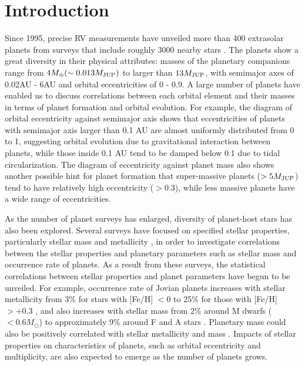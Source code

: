 \documentclass[manuscript]{aastex}
\newcommand{\mjup}{M_{\rm JUP}}
\begin{document}
\section{Introduction}

Since 1995, precise RV measurements have unveiled more than 400 extrasolar planets from surveys that include roughly 3000 nearby stars \citep[e.g.,][]{2007ARA&A..45..397U}.
The planets show a great diversity in their physical attributes: masses of the planetary companions range from $4M_{\oplus} (\sim 0.013\mjup)$ to larger than $13\mjup$, with semimajor axes of 0.02AU - 6AU and orbital eccentricities of 0 - 0.9.
A large number of planets have enabled us to discuss correlations between each orbital element and their masses in terms of planet formation and orbital evolution.
For example, the diagram of orbital eccentricity against semimajor axis shows that eccentricities of planets with semimajor axis larger than 0.1 AU are almost uniformly distributed from 0 to 1, suggesting orbital evolution due to gravitational interaction between planets, while those inside 0.1 AU tend to be damped below 0.1 due to tidal circularization.
The diagram of eccentricity against planet mass also shows another possible hint for planet formation that super-massive planets ($>5 \mjup$) tend to have relatively high eccentricity ($>0.3$), while less massive planets have a wide range of eccentricities.

As the number of planet surveys has enlarged, diversity of planet-host stars has also been explored.
Several surveys have focused on specified stellar properties, particularly stellar mass \citep{2005A&A...443L..15B, 2010PASP..122..156A, 2008PASJ...60.1317S, 2007ApJ...665..785J} and metallicity \citep{2005ApJ...620..481F,2009ApJ...697..544S}, in order to investigate correlations between the stellar properties and planetary parameters such as stellar mass and occurrence rate of planets.
As a result from these surveys, the statistical correlations between stellar properties and planet parameters have begun to be unveiled.
For example, occurrence rate of Jovian planets increases with stellar metallicity from 3\% for stars with [Fe/H] $< 0$ to 25\% for those with [Fe/H] $> +0.3$ \citep{2005ApJ...620..481F}, and also increases with stellar mass from 2\% around M dwarfs ($< 0.6 M_{\odot}$) to approximately 9\% around F and A stars \citep[1.2 - 1.9 $M_{\odot}$;][]{2007ApJ...665..785J}.
Planetary mass could also be positively correlated with stellar metallicity and mass \citep{2007A&A...472..657L}.
Impacts of stellar properties on characteristics of planets, such as orbital eccentricity and multiplicity, are also expected to emerge as the number of planets grows.
\end{document}

